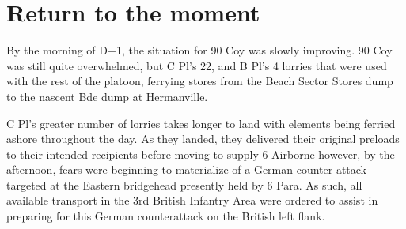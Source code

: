 \documentclass[noraggedright]{turabian-researchpaper}
\begin{document}


	



\section{Return to the moment} %

By the morning of D+1, the situation for 90 Coy was slowly improving.  90 Coy 
was still quite overwhelmed, but C Pl's 22, and B Pl's 4 lorries that were used
with the rest of the platoon, ferrying stores from the Beach Sector Stores 
dump to the nascent Bde dump at Hermanville.  

C Pl's greater number of lorries takes longer to land with elements being 
ferried ashore throughout the day.  As they landed, they delivered their
original preloads to their intended recipients before moving to supply 
6 Airborne however, by the afternoon, fears were beginning to materialize of
a German counter attack targeted at the Eastern bridgehead presently held by
6 Para.  As such, all available transport in the 3rd British Infantry Area
were ordered to assist in preparing for this German counterattack on the 
British left flank.  
\end{document}
